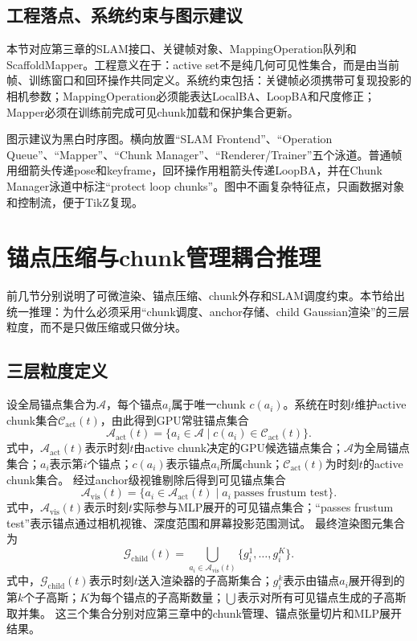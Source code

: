 \subsection{工程落点、系统约束与图示建议}

本节对应第三章的SLAM接口、关键帧对象、MappingOperation队列和ScaffoldMapper。工程意义在于：active set不是纯几何可见性集合，而是由当前帧、训练窗口和回环操作共同定义。系统约束包括：关键帧必须携带可复现投影的相机参数；MappingOperation必须能表达LocalBA、LoopBA和尺度修正；Mapper必须在训练前完成可见chunk加载和保护集合更新。

图示建议为黑白时序图。横向放置``SLAM Frontend''、``Operation Queue''、``Mapper''、``Chunk Manager''、``Renderer/Trainer''五个泳道。普通帧用细箭头传递pose和keyframe，回环操作用粗箭头传递LoopBA，并在Chunk Manager泳道中标注``protect loop chunks''。图中不画复杂特征点，只画数据对象和控制流，便于TikZ复现。

\section{锚点压缩与chunk管理耦合推理}

前几节分别说明了可微渲染、锚点压缩、chunk外存和SLAM调度约束。本节给出统一推理：为什么\ScaffoldChunGS 必须采用``chunk调度、anchor存储、child Gaussian渲染''的三层粒度，而不是只做压缩或只做分块。

\subsection{三层粒度定义}

设全局锚点集合为$\mathcal{A}$，每个锚点$a_i$属于唯一chunk $c(a_i)$。系统在时刻$t$维护active chunk集合$\mathcal{C}_{\mathrm{act}}(t)$，由此得到GPU常驻锚点集合
\begin{equation}
\mathcal{A}_{\mathrm{act}}(t)
=
\{a_i\in\mathcal{A}\mid c(a_i)\in\mathcal{C}_{\mathrm{act}}(t)\}.
\end{equation}
式中，$\mathcal{A}_{\mathrm{act}}(t)$表示时刻$t$由active chunk决定的GPU候选锚点集合；$\mathcal{A}$为全局锚点集合；$a_i$表示第$i$个锚点；$c(a_i)$表示锚点$a_i$所属chunk；$\mathcal{C}_{\mathrm{act}}(t)$为时刻$t$的active chunk集合。
经过anchor级视锥剔除后得到可见锚点集合
\begin{equation}
\mathcal{A}_{\mathrm{vis}}(t)
=
\{a_i\in\mathcal{A}_{\mathrm{act}}(t)\mid a_i\ \text{passes frustum test}\}.
\end{equation}
式中，$\mathcal{A}_{\mathrm{vis}}(t)$表示时刻$t$实际参与MLP展开的可见锚点集合；``passes frustum test''表示锚点通过相机视锥、深度范围和屏幕投影范围测试。
最终渲染图元集合为
\begin{equation}
\mathcal{G}_{\mathrm{child}}(t)
=
\bigcup_{a_i\in\mathcal{A}_{\mathrm{vis}}(t)}
\{g_i^1,\dots,g_i^K\}.
\end{equation}
式中，$\mathcal{G}_{\mathrm{child}}(t)$表示时刻$t$送入渲染器的子高斯集合；$g_i^k$表示由锚点$a_i$展开得到的第$k$个子高斯；$K$为每个锚点的子高斯数量；$\bigcup$表示对所有可见锚点生成的子高斯取并集。
这三个集合分别对应第三章中的chunk管理、锚点张量切片和MLP展开结果。

